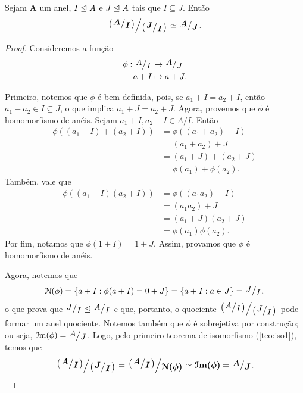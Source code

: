 \begin{teo}
	Sejam $\bm A$ um anel, $I \mathrel{\unlhd} A$ e $J \mathrel{\unlhd} A$ tais que $I \subseteq J$. Então
	\begin{equation*}
	\bm{\quo{\left(\quo{A}{I}\right)}{\left(\quo{J}{I}\right)}} \simeq \bm{\quo{A}{J}}.
	\end{equation*}
\end{teo}
\begin{proof}
	Consideremos a função
	\begin{align*}
	\phi: \quo{A}{I} &\to \quo{A}{J} \\
		a+I &\mapsto a+J.
	\end{align*}

	Primeiro, notemos que $\phi$ é bem definida, pois, se $a_1+I=a_2+I$, então $a_1-a_2 \in I \subseteq J$, o que implica $a_1+J=a_2+J$. Agora, provemos que $\phi$ é homomorfismo de anéis. Sejam $a_1+I,a_2+I \in A/I$. Então
	\begin{align*}
	\phi((a_1+I)+(a_2+I))&=\phi((a_1+a_2)+I) \\
		&=(a_1+a_2)+J \\
		&=(a_1+J)+(a_2+J) \\
		&=\phi(a_1)+\phi(a_2).
	\end{align*}
Também, vale que
	\begin{align*}
	\phi((a_1+I)(a_2+I))&=\phi((a_1a_2)+I) \\
		&=(a_1a_2)+J \\
		&=(a_1+J)(a_2+J) \\
		&=\phi(a_1)\phi(a_2).
	\end{align*}
Por fim, notamos que $\phi(1+I)=1+J$. Assim, provamos que $\phi$ é homomorfismo de anéis.

	Agora, notemos que
	\begin{equation*}
	\nuc(\phi)=\{a+I:\phi(a+I)=0+J\}=\{a+I:a \in J\}=\quo{J}{I},
	\end{equation*}
o que prova que $\quo{J}{I} \ide \quo{A}{I}$ e que, portanto, o quociente $\quo{\left(\quo{A}{I}\right)}{\left(\quo{J}{I}\right)}$ pode formar um anel quociente. Notemos também que $\phi$ é sobrejetiva por construção; ou seja, $\im(\phi)=\quo{A}{J}$. Logo, pelo primeiro teorema de isomorfismo (\ref{teo:iso1}), temos que
	\begin{equation*}
	\bm{\quo{\left(\quo{A}{I}\right)}{\left(\quo{J}{I}\right)}}=\bm{\quo{\left(\quo{A}{I}\right)}{\nuc(\phi)}} \simeq \bm{\im(\phi)}=\bm{\quo{A}{J}}.
	\end{equation*}
\end{proof}

